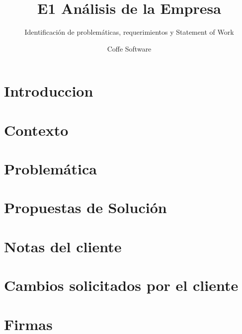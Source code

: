 \documentclass[11pt]{book}
\author{Coffe Software}
\title{E1 Análisis de la Empresa}
\subtitle{Identificación de problemáticas, requerimientos y Statement of Work}
\begin{document}
	
	
	\tableofcontents
	
	\chapter{Introduccion}
	\label{ch:intro}
	
	
	\chapter{Contexto}
	\label{ch:contexto}
	
	
	\chapter{Problemática}
	\label{ch:problematica}
	
	
	\chapter{Propuestas de Solución}
	\label{ch:propuestas}
	
	
	\appendix
	
	\chapter{Notas del cliente}
	\label{ch:notas}
	
	\chapter{Cambios solicitados por el cliente}
	\label{ch:cambios}
	
	\chapter{Firmas}
	\label{ch:firmas}
	
\end{document}

